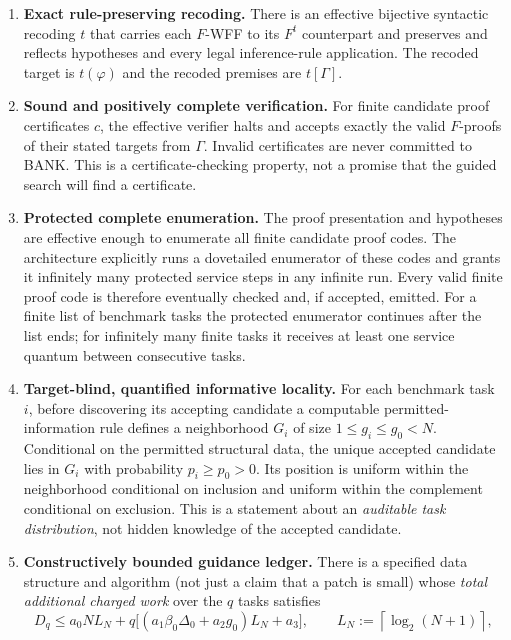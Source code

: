 \documentclass[11pt,letterpaper]{article}
\theoremstyle{definition}
\theoremstyle{remark}
\newcommand{\ceil}[1]{\left\lceil #1\right\rceil}
\begin{document}
\begin{enumerate}[leftmargin=2.7em,label=\textbf{H\arabic*.},itemsep=0.65em]
 \item \textbf{Exact rule-preserving recoding.} There is an effective bijective syntactic recoding $t$ that carries each $F$-WFF to its $F^t$ counterpart and preserves and reflects hypotheses and every legal inference-rule application. The recoded target is $t(\varphi)$ and the recoded premises are $t[\Gamma]$.
 \item \textbf{Sound and positively complete verification.} For finite candidate proof certificates $c$, the effective verifier halts and accepts exactly the valid $F$-proofs of their stated targets from $\Gamma$. Invalid certificates are never committed to BANK. This is a certificate-checking property, not a promise that the guided search will find a certificate.
 \item \textbf{Protected complete enumeration.} The proof presentation and hypotheses are effective enough to enumerate all finite candidate proof codes. The architecture explicitly runs a dovetailed enumerator of these codes and grants it infinitely many protected service steps in any infinite run. Every valid finite proof code is therefore eventually checked and, if accepted, emitted. For a finite list of benchmark tasks the protected enumerator continues after the list ends; for infinitely many finite tasks it receives at least one service quantum between consecutive tasks.
 \item \textbf{Target-blind, quantified informative locality.} For each benchmark task $i$, before discovering its accepting candidate a computable permitted-information rule defines a neighborhood $G_i$ of size $1\le g_i\le g_0<N$. Conditional on the permitted structural data, the unique accepted candidate lies in $G_i$ with probability $p_i\ge p_0>0$. Its position is uniform within the neighborhood conditional on inclusion and uniform within the complement conditional on exclusion. This is a statement about an \emph{auditable task distribution}, not hidden knowledge of the accepted candidate.
 \item \textbf{Constructively bounded guidance ledger.} There is a specified data structure and algorithm (not just a claim that a patch is small) whose \emph{total additional charged work} over the $q$ tasks satisfies
 \begin{equation}\label{eq:overhead}
 D_q\le a_0N L_N+q\bigl[(a_1\beta_0\Delta_0+a_2g_0)L_N+a_3\bigr],\qquad L_N:=\ceil{\log_2(N+1)},
 \end{equation}

\end{enumerate}
\end{document}
